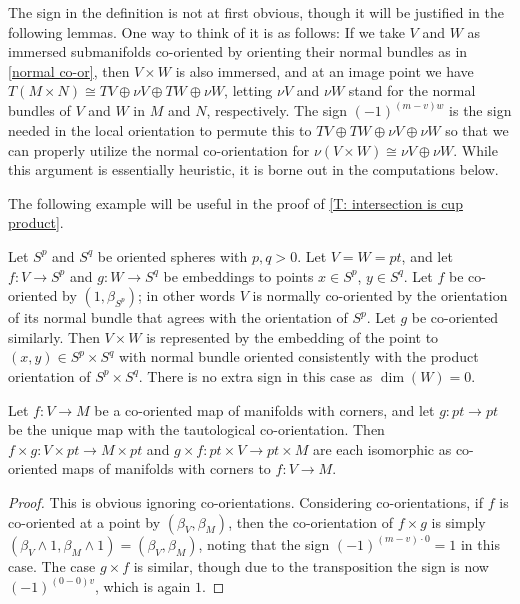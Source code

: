 \begin{remark}
	The sign in the definition is not at first obvious, though it will be justified in the following lemmas.
	One way to think of it is as follows: If we take $V$ and $W$ as immersed submanifolds co-oriented by orienting their normal bundles as in \cref{normal co-or}, then $V \times W$ is also immersed, and at an image point we have $T(M \times N) \cong TV \oplus \nu V \oplus TW \oplus \nu W$, letting $\nu V$ and $\nu W$ stand for the normal bundles of $V$ and $W$ in $M$ and $N$, respectively.
	The sign $(-1)^{(m-v)w}$ is the sign needed in the local orientation to permute this to $TV \oplus TW \oplus \nu V \oplus \nu W$ so that we can properly utilize the normal co-orientation for $\nu(V \times W) \cong \nu V \oplus \nu W$.
	While this argument is essentially heuristic, it is borne out in the computations below.
\end{remark}

The following example will be useful in the proof of \cref{T: intersection is cup product}.

\begin{example}\label{E: sphere product}
	Let $S^p$ and $S^q$ be oriented spheres with $p,q>0$.
	Let $V = W = pt$, and let $f \colon V \to S^p$ and $g \colon W \to S^q$ be embeddings to points $x \in S^p$, $y \in S^q$.
	Let $f$ be co-oriented by $(1,\beta_{S^p})$; in other words $V$ is normally co-oriented by the orientation of its normal bundle that agrees with the orientation of $S^p$.
	Let $g$ be co-oriented similarly.
	Then $V \times W$ is represented by the embedding of the point to $(x,y) \in S^p \times S^q$ with normal bundle oriented consistently with the product orientation of $S^p \times S^q$.
	There is no extra sign in this case as $\dim(W) = 0$.
\end{example}

\begin{proposition}\label{P: co-oriented exterior unit}
	Let $f \colon V \to M$ be a co-oriented map of manifolds with corners, and let $g:pt \to pt$ be the unique map with the tautological co-orientation.
	Then $f \times g \colon V \times pt \to M \times pt$ and $g \times f:pt \times V \to pt \times M$ are each isomorphic as co-oriented maps of manifolds with corners to $f \colon V \to M$.
\end{proposition}

\begin{proof}
	This is obvious ignoring co-orientations.
	Considering co-orientations, if $f$ is co-oriented at a point by $(\beta_V,\beta_M)$, then the co-orientation of $f \times g$ is simply $(\beta_V \wedge 1,\beta_M \wedge 1) = (\beta_V,\beta_M)$, noting that
	the sign $(-1)^{(m-v)\cdot 0} = 1$ in this case.
	The case $g \times f$ is similar, though due to the transposition the sign is now $(-1)^{(0-0)v}$, which is again $1$.
\end{proof}

